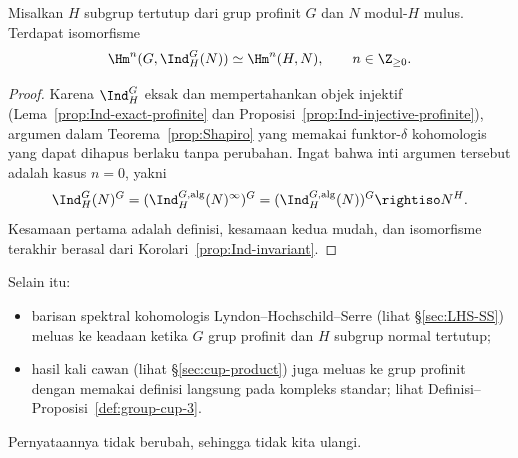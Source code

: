 \begin{proposition}
	Misalkan $H$ subgrup tertutup dari grup profinit $G$ dan $N$ modul-$H$
	mulus. Terdapat isomorfisme
	\[ \Hm^n(G,\Ind^G_H(N))\simeq\Hm^n(H,N),
	\qquad n\in\Z_{\geq0}. \]
\end{proposition}
\begin{proof}
	Karena $\Ind^G_H$ eksak dan mempertahankan objek injektif
	(Lema~\ref{prop:Ind-exact-profinite} dan
	Proposisi~\ref{prop:Ind-injective-profinite}), argumen dalam
	Teorema~\ref{prop:Shapiro} yang memakai funktor-$\delta$ kohomologis yang
	dapat dihapus berlaku tanpa perubahan. Ingat bahwa inti argumen tersebut adalah
	kasus $n=0$, yakni
	\[ \Ind^G_H(N)^G
	=(\Ind^{G,\mathrm{alg}}_H(N)^\infty)^G
	=(\Ind^{G,\mathrm{alg}}_H(N))^G\rightiso N^H. \]
	Kesamaan pertama adalah definisi, kesamaan kedua mudah, dan isomorfisme
	terakhir berasal dari Korolari~\ref{prop:Ind-invariant}.
\end{proof}

Selain itu:
\begin{itemize}
	\item barisan spektral kohomologis Lyndon--Hochschild--Serre
	(lihat \S\ref{sec:LHS-SS}) meluas ke keadaan ketika $G$ grup profinit dan
	$H$ subgrup normal tertutup;
	\item hasil kali cawan (lihat \S\ref{sec:cup-product}) juga meluas ke grup
	profinit dengan memakai definisi langsung pada kompleks standar; lihat
	Definisi--Proposisi~\ref{def:group-cup-3}.
\end{itemize}
Pernyataannya tidak berubah, sehingga tidak kita ulangi.
